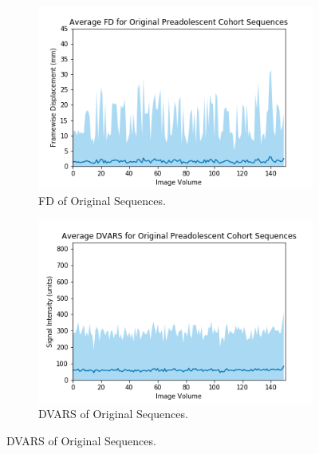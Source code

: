 \begin{figure}
	\centering
	\begin{subfigure}{0.4\textwidth}
		\centering
		\includegraphics[width=1.0\textwidth]{6/figures/preads-bold-fd-150.png}
		\caption{FD of Original Sequences.}
	\end{subfigure}
	\hspace{0.05\textwidth}
	\begin{subfigure}{0.4\textwidth}
		\centering
		\includegraphics[width=1.0\textwidth]{6/figures/preads-bold-dvars-150.png}
		\caption{DVARS of Original Sequences.}
	\end{subfigure}
	

\end{figure}
